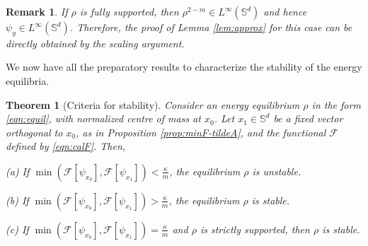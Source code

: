 \documentclass[11pt]{amsart}
\newtheorem{theorem}{Theorem}[section]
\newtheorem{remark}{Remark}[section]
\newcommand{\bbs}{\mathbb S}
\newcommand{\calF}{\mathcal{F}}
\newcommand{\dm}{d} %
\begin{document}
\begin{remark}
If $\rho$ is fully supported, then $\rho^{2-m}\in L^\infty(\bbs^\dm)$ and hence $\psi_y\in L^\infty(\bbs^\dm)$. Therefore, the proof of Lemma \ref{lem:approx} for this case can be directly obtained by the scaling argument.
\end{remark}



We now have all the preparatory results to characterize the stability of the energy equilibria.
\begin{theorem}[Criteria for stability]
\label{thm:minF}
Consider an energy equilibrium $\rho$ in the form \eqref{eqn:equil}, with normalized centre of mass at $x_0$. Let $x_1 \in \bbs^\dm$ be a fixed vector orthogonal to $x_0$, as in Proposition \ref{prop:minF-tildeA}, and the functional $\calF$ defined by \eqref{eqn:calF}. Then,
\smallskip

(a) If $\min(\mathcal{F}[\psi_{x_0}],\mathcal{F}[\psi_{x_1}])<\frac{\kappa}{m}$, the equilibrium $\rho$ is unstable. \smallskip

(b) If $\min(\mathcal{F}[\psi_{x_0}],\mathcal{F}[\psi_{x_1}])>\frac{\kappa}{m}$, the equilibrium $\rho$ is stable. \smallskip

(c) If $\min(\mathcal{F}[\psi_{x_0}],\mathcal{F}[\psi_{x_1}])=\frac{\kappa}{m}$ and $\rho$ is strictly supported, then $\rho$ is stable.
\end{theorem}
\end{document}
